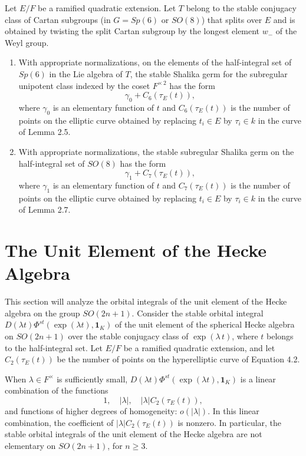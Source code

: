 \documentclass{amsart}
\begin{document}
  Let $E/F$ be a ramified quadratic
extension.  Let $T$ belong to  the stable conjugacy
class of Cartan subgroups
(in $G= Sp(6)$ or $SO(8)$) that splits over $E$ and
is obtained by twisting the split Cartan subgroup
by the longest element $w_-$ of the Weyl group.
\begin{enumerate}[label=(\arabic*)]
\item With appropriate normalizations, on the elements
of the half-integral set of $Sp(6)$ in the Lie algebra
of $T$,
the stable Shalika germ for the subregular unipotent
class indexed by the coset
$F^{\times\,2}$ has the form
$$\gamma_0 + C_6(\tau_E(t)),$$
where $\gamma_0$ is an elementary function of $t$
and $C_6(\tau_E(t))$ is the number of points on the elliptic
curve obtained by replacing $t_i\in E$ by
$\tau_i\in k$ in the curve of Lemma 2.5.
\item With appropriate normalizations,
the stable  subregular
Shalika germ on the half-integral set of $SO(8)$ has the form
$$\gamma_1 + C_7(\tau_E(t)),$$
where $\gamma_1$ is an elementary function of $t$
and $C_7(\tau_E(t))$ is the number of points on the elliptic
curve obtained by replacing $t_i\in E$ by $\tau_i\in k$
in the curve of Lemma 2.7.
\end{enumerate}
\endproclaim

\section{The Unit Element of the Hecke Algebra}


This section will analyze the orbital integrals of the unit element
of the Hecke algebra on the group $SO(2n+1)$.
Consider the stable orbital integral 
$D(\lambda t)\Phi^{st}
(\exp(\lambda t),{\pmb 1}_K)$
 of the unit element of
the spherical Hecke algebra on $SO(2n+1)$
over the stable conjugacy class of $\exp(\lambda\,t)$,
where $t$ belongs to the half-integral set.
  Let
$E/F$ be a ramified quadratic extension, and let
$C_2(\tau_E(t))$ be the number of points on the
hyperelliptic curve of Equation 4.2.

 When $\lambda\in F^\times$ is sufficiently small,
$D(\lambda t)\Phi^{st}
(\exp(\lambda t),{\pmb 1}_K)$ is
a linear combination of the functions
$$1,\quad |\lambda|,\quad |\lambda| C_2(\tau_E(t)),$$
and functions of higher degrees of homogeneity: $o(|\lambda|)$.
In this linear combination, the coefficient of $|\lambda|C_2(\tau_E(t))$
is nonzero.  In particular, the stable orbital integrals of the
unit element of the Hecke algebra are not elementary
on $SO(2n+1)$, for $n\ge 3$.
\endproclaim
\end{document}
